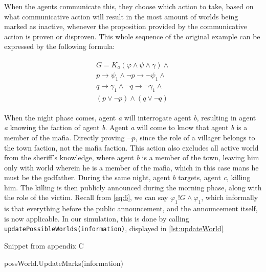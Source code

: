 When the agents communicate this, they choose which action to take, based on
what communicative action will result in the most amount of worlds being marked
as inactive, whenever the proposition provided by the communicative action is
proven or disproven. This whole sequence of the original example can be
expressed by the following formula:

\begin{align}
	\begin{split}
		G = K_a(\varphi \land \psi \land\gamma)\land                        \\
		p \rightarrow \psi_1 \land \neg p \rightarrow \neg \psi_1 \land     \\
		q \rightarrow \gamma_1 \land \neg q \rightarrow \neg \gamma_1 \land \\
		(p \lor \neg p) \land (q \lor \neg q)
		\label{eq:7}
	\end{split}
\end{align}

When the night phase comes, agent \textit{a} will interrogate agent \textit{b},
resulting in agent \textit{a} knowing the faction of agent \textit{b}. Agent
\textit{a} will come to know that agent \textit{b} is a member of the mafia.
Directly proving $\neg p$, since the role of a villager belongs to the town
faction, not the mafia faction. This action also excludes all active world from
the sheriff's knowledge, where agent \textit{b} is a member of the town,
leaving him only with world wherein he is a member of the mafia, which in this
case mans he must be the godfather. During the same night, agent \textit{b}
targets, agent \textit{c}, killing him. The killing is then publicly announced
during the morning phase, along with the role of the victim. Recall from
\cref{eq:6}, we can say $\varphi_1!G\land\varphi_1$, which informally is that
everything before the public announcement, and the announcement itself, is now
applicable. In our simulation, this is done by calling
\lstinline[]{updatePossibleWorlds(information)}, displayed in
\ref{lst:updateWorld}

\begin{algorithm}[h]
	\caption{Snippet from appendix C}
	\begin{algorithmic}[1]
		\State possWorld.UpdateMarks(information)
		\EndFor
		\EndFor
		\EndFunction
	\end{algorithmic}
\end{algorithm}\label{lst:updateWorld}

